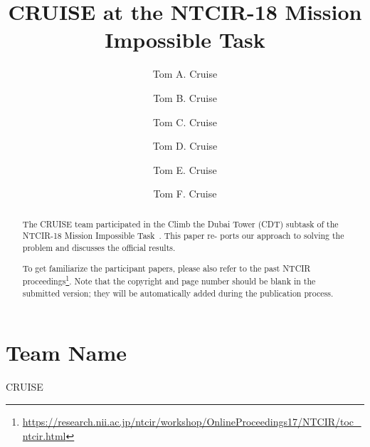 \documentclass[sigconf,article]{acmart}
\begin{document}
\title{CRUISE at the NTCIR-18 Mission Impossible Task}

\author{Tom A. Cruise}
\author{Tom B. Cruise}
\author{Tom C. Cruise}
\author{Tom D. Cruise}
\author{Tom E. Cruise}
\author{Tom F. Cruise}


\begin{abstract}
The CRUISE team participated in the Climb the Dubai Tower (CDT) subtask of the NTCIR-18 Mission Impossible Task~\cite{mioverview}. This paper re- ports our approach to solving the problem and discusses the official results.

To get familiarize the participant papers, please also refer to the past NTCIR proceedings\footnote{\url{https://research.nii.ac.jp/ntcir/workshop/OnlineProceedings17/NTCIR/toc_ntcir.html}}. Note that the copyright and page number should be blank in the submitted version; they will be automatically added during the publication process. 
\end{abstract}


\maketitle
\pagestyle{plain} %

\section*{Team Name}
CRUISE
\end{document}
